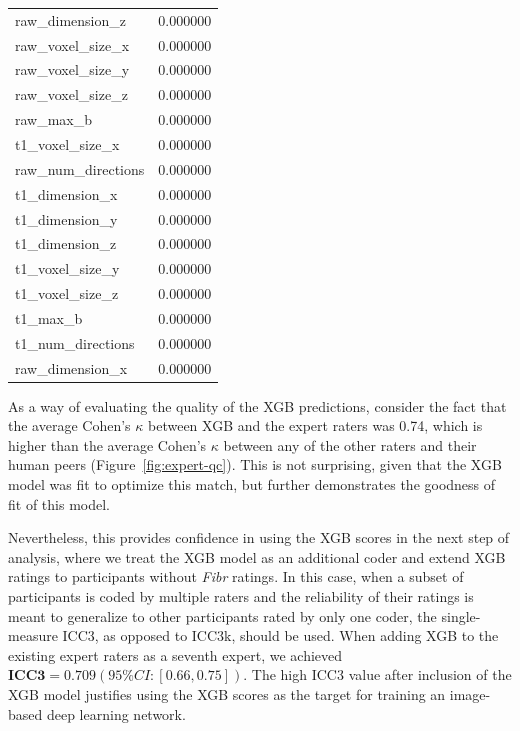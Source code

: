 \documentclass[fleqn,10pt,inline]{wlscirep}
\begin{document}
\begin{table}[tbp]
\begin{multicols}{2}
{\begin{tabular}{lr}
raw\_dimension\_z       &                  0.000000 \\
raw\_voxel\_size\_x      &                  0.000000 \\
raw\_voxel\_size\_y      &                  0.000000 \\
raw\_voxel\_size\_z      &                  0.000000 \\
raw\_max\_b             &                  0.000000 \\
t1\_voxel\_size\_x       &                  0.000000 \\
raw\_num\_directions    &                  0.000000 \\
t1\_dimension\_x        &                  0.000000 \\
t1\_dimension\_y        &                  0.000000 \\
t1\_dimension\_z        &                  0.000000 \\
t1\_voxel\_size\_y       &                  0.000000 \\
t1\_voxel\_size\_z       &                  0.000000 \\
t1\_max\_b              &                  0.000000 \\
t1\_num\_directions     &                  0.000000 \\
raw\_dimension\_x       &                  0.000000 \\
\bottomrule
\end{tabular}
}
\end{multicols}
\end{table}


As a way of evaluating the quality of the XGB predictions, consider the fact
that the average Cohen's $\kappa$ between XGB and the expert raters was 0.74,
which is higher than the average Cohen's $\kappa$ between any of the other raters
and their human peers (Figure~\ref{fig:expert-qc}). This is not surprising,
given that the XGB model was fit to optimize this match, but further
demonstrates the goodness of fit of this model.

Nevertheless, this provides confidence in using the XGB scores in the next step of analysis, where we treat the XGB model as an additional coder and extend XGB ratings to participants without \emph{Fibr} ratings.
In this case, when a subset of participants is coded by multiple raters and the
reliability of their ratings is meant to generalize to other participants rated by
only one coder, the single-measure ICC3, as opposed to ICC3k, should be used. When adding XGB to the
existing expert raters as a seventh expert, we achieved
$\textbf{ICC3} = 0.709 (95\% CI: [0.66, 0.75])$. 
The high ICC3 value after inclusion of the XGB model justifies using the XGB scores as the target for training an image-based deep learning
network.
\end{document}
